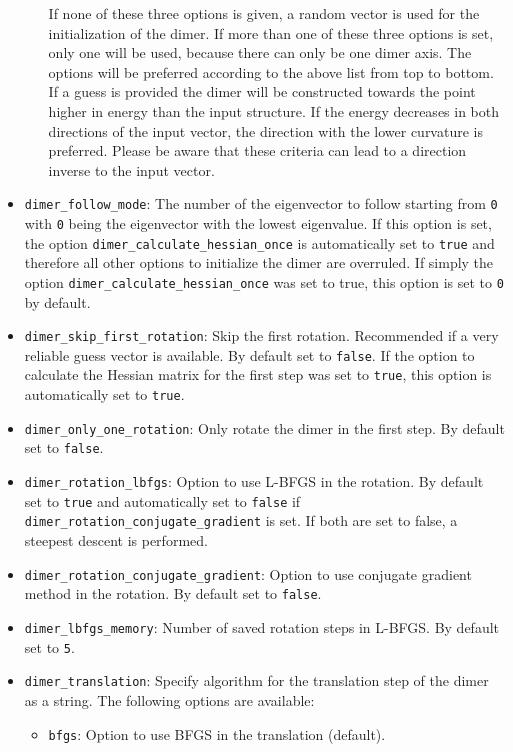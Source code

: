 \documentclass[]{tufte-book}
\begin{document}
\begin{itemize}
\begin{itemize}
If none of these three options is given, a random vector is used for the initialization of the dimer. If more than one of these three options is set, only one will be used, because there can only be one dimer axis. The options will be preferred according to the above list from top to bottom. If a guess is provided the dimer will be constructed towards the point higher in energy than the input structure. If the energy decreases in both directions of the input vector, the direction with the lower curvature is preferred. Please be aware that these criteria can lead to a direction inverse to the input vector.
\end{itemize}
\item \texttt{dimer\_follow\_mode}: The number of the eigenvector to follow starting from \texttt{0} with \texttt{0} being the eigenvector with the lowest eigenvalue. If this option is set, the option \texttt{dimer\_calculate\_hessian\_once} is automatically set to \texttt{true} and therefore all other options to initialize the dimer are overruled. If simply the option \texttt{dimer\_calculate\_hessian\_once} was set to true, this option is set to \texttt{0} by default.
\item \texttt{dimer\_skip\_first\_rotation}: Skip the first rotation. Recommended if a very reliable guess vector is available. By default set to \texttt{false}. If the option to calculate the Hessian matrix for the first step was set to \texttt{true}, this option is automatically set to \texttt{true}.
\item \texttt{dimer\_only\_one\_rotation}: Only rotate the dimer in the first step. By default set to \texttt{false}.
\item \texttt{dimer\_rotation\_lbfgs}: Option to use L-BFGS in the rotation. By default set to \texttt{true} and automatically set to \texttt{false} if \texttt{dimer\_rotation\_conjugate\_gradient} is set. If both are set to false, a steepest descent is performed.
\item \texttt{dimer\_rotation\_conjugate\_gradient}: Option to use conjugate gradient method in the rotation. By default set to \texttt{false}.
\item \texttt{dimer\_lbfgs\_memory}: Number of saved rotation steps in L-BFGS. By default set to \texttt{5}.
\item \texttt{dimer\_translation}: Specify algorithm for the translation step of the dimer as a string. The following options are available:
\begin{itemize}
\item \texttt{bfgs}: Option to use BFGS in the translation (default).

\end{itemize}
\end{itemize}
\end{document}
